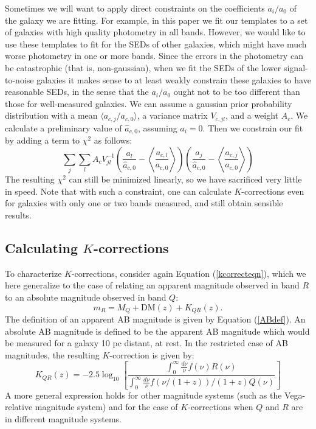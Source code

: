 \documentclass[10pt,preprint]{aastex}
\newcommand{\avg}[1]{{\langle{#1}\rangle}}
\newcommand{\Avg}[1]{{\left\langle{#1}\right\rangle}}
\begin{document}
Sometimes we will want to apply direct constraints on the coefficients
$a_i/a_0$ of the galaxy we are fitting. For example, in this paper we
fit our templates to a set of galaxies with high quality photometry in
all bands. However, we would like to use these templates to fit for
the SEDs of other galaxies, which might have much worse photometry in
one or more bands. Since the errors in the photometry can be
catastrophic (that is, non-gaussian), when we fit the SEDs of the
lower signal-to-noise galaxies it makes sense to at least weakly
constrain these galaxies to have reasonable SEDs, in the sense that
the $a_i/a_0$ ought not to be too different than those for
well-measured galaxies. We can assume a gaussian prior probability
distribution with a mean $\avg{a_{c,j}/a_{c,0}}$, a variance matrix
$V_{c,jl}$, and a weight $A_c$.  We calculate a preliminary value of
${\hat{a}}_{c,0}$, assuming $a_i = 0$. Then we constrain our fit by
adding a term to $\chi^2$ as follows:
\begin{equation}
\sum_j \sum_l A_c V^{-1}_{jl}
\left(\frac{a_l}{{\hat{a}}_{c,0}}-\Avg{\frac{a_{c,l}}{a_{c,0}}}\right)
\left(\frac{a_j}{{\hat{a}}_{c,0}}-\Avg{\frac{a_{c,j}}{a_{c,0}}}\right)
\end{equation}
The resulting $\chi^2$ can still be minimized linearly, so we have
sacrificed very little in speed.  Note that with such a constraint,
one can calculate $K$-corrections even for galaxies with only one or
two bands measured, and still obtain sensible results. 

\subsection{Calculating $K$-corrections}

To characterize $K$-corrections, consider again Equation
(\ref{kcorrecteqn}), which we here generalize to the case of relating
an apparent magnitude observed in band $R$ to an absolute magnitude
observed in band $Q$:
\begin{equation}
m_R = M_Q + \mathrm{DM}(z) + K_{QR}(z).
\end{equation}
The definition of an apparent AB magnitude is given by Equation
(\ref{ABdef}). An absolute AB magnitude is defined to be the apparent
AB magnitude which would be measured for a galaxy 10 pc distant, at
rest.  In the restricted case of AB magnitudes, the resulting
$K$-correction is given by:
\begin{equation}
K_{QR}(z) = -2.5 \log_{10} \left[
\frac{
\int_0^{\infty} \frac{d\nu}{\nu} f(\nu) R(\nu)
}{
\int_0^{\infty} \frac{d\nu}{\nu} f(\nu/(1+z))/(1+z) Q(\nu)
}
\right]
\end{equation}
A more general expression holds for other magnitude systems (such as
the Vega-relative magnitude system) and for the case of
$K$-corrections when $Q$ and $R$ are in different magnitude systems. 
\end{document}
